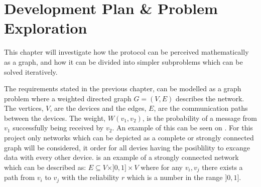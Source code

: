 \chapter{Development Plan \& Problem Exploration}\label{chp:Problems}
This chapter will investigate how the protocol can be perceived mathematically as a graph, and how it can be divided into simpler subproblems which can be solved iteratively.

The requirements stated in the previous chapter, can be modelled as a graph problem where a weighted directed graph $G = (V, E)$ describes the network. 
The vertices, $V$, are the devices and the edges, $E$, are the communication paths between the devices. 
The weight, $W(v_1, v_2)$, is the probability of a message from $v_1$ successfully being received by $v_2$.
An example of this can be seen on .
For this project only networks which can be depicted as a complete or strongly connected graph will be considered, it order for all devies having the posiblility to excange data with every other device.
 is an example of a strongly connected network which can be described as: $E \subseteq V \times ]0,1] \times V$ where for any $v_i, v_j$ there exists a path from $v_i$ to $v_j$ with the reliability $r$ which is a number in the range $]0,1]$.


